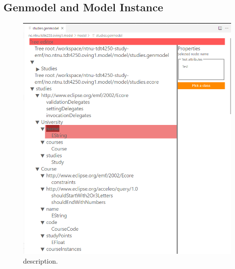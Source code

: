\subsection{Genmodel and Model Instance}

\begin{figure}[htbp]  %
  \centering
  \includegraphics[width=\textwidth]{figures/gitpod-vscode-genmodel.png}
  \caption[title]{description.}\label{fig:label3}
\end{figure}

